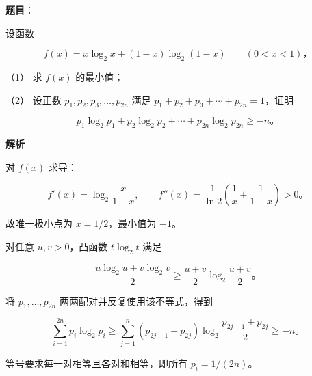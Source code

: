 \begin{answer}

\textbf{题目}：

设函数

\nopagebreak[4]
\[
f(x)=x\log_2x+(1-x)\log_2(1-x)\qquad(0<x<1)\text{，}
\]

（1） 求 $f(x)$ 的最小值；

（2） 设正数 $p_1,p_2,p_3,\ldots,p_{2n}$ 满足 $p_1+p_2+p_3+\cdots+p_{2n}=1$，证明

\nopagebreak[4]
\[
p_1\log_2p_1+p_2\log_2p_2+\cdots+p_{2n}\log_2p_{2n}\geqslant-n\text{。}
\]

\textbf{解析}


对 $f(x)$ 求导：

\nopagebreak[4]
\[
f'(x)=\log_2\frac{x}{1-x},\qquad
f''(x)=\frac1{\ln2}\left(\frac1x+\frac1{1-x}\right)>0\text{。}
\]

故唯一极小点为 $x=1/2$，最小值为 $-1$。


对任意 $u,v>0$，凸函数 $t\log_2t$ 满足

\nopagebreak[4]
\[
\frac{u\log_2u+v\log_2v}{2}
\geqslant\frac{u+v}{2}\log_2\frac{u+v}{2}\text{。}
\]

将 $p_1,\ldots,p_{2n}$ 两两配对并反复使用该不等式，得到

\nopagebreak[4]
\[
\sum_{i=1}^{2n}p_i\log_2p_i
\geqslant
\sum_{j=1}^{n}(p_{2j-1}+p_{2j})\log_2\frac{p_{2j-1}+p_{2j}}2
\geqslant -n\text{。}
\]

等号要求每一对相等且各对和相等，即所有 $p_i=1/(2n)$。



\end{answer}